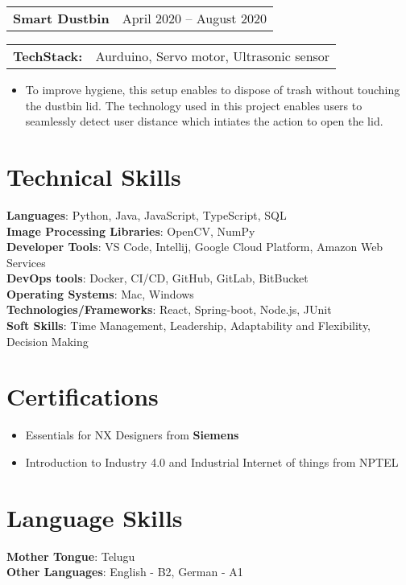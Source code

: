 \documentclass[letterpaper,11pt]{article}
\makeatletter
\newcommand{\resumeItem}[1]{
  \item\small{
    {#1 \vspace{-2pt}}
  }
}
\newcommand{\projecttitle}[2]{
  \noindent
  \begin{tabular*}{\textwidth}{l@{\extracolsep{\fill}}r}
    \textbf{\small#1} & \small#2
  \end{tabular*}
  \vspace{-15pt}
}
\newcommand{\techstack}[2]{
  \begin{tabularx}{\textwidth}{l@{\hspace{5pt}} X}
    \textbf{\small#1} & \small#2
  \end{tabularx}
  \vspace{-18pt}
}
\newcommand{\resumeItemListStart}{\begin{itemize}}
\newcommand{\resumeItemListEnd}{\end{itemize}\vspace{-5pt}}
\makeatother
\begin{document}
\projecttitle{Smart Dustbin}{April 2020 -- August 2020}

\techstack{TechStack:}{Aurduino, Servo motor, Ultrasonic sensor}
\resumeItemListStart
\resumeItem{To improve hygiene, this setup enables to dispose of trash without touching the dustbin lid. The technology used in this project enables users to seamlessly detect user distance which intiates the action to open the lid.}
\resumeItemListEnd

\vspace{-10pt}


%
\section{Technical Skills}
\begin{itemize}[leftmargin=0.15in, label={}]
  \small{\item{
        \textbf{Languages}{: Python, Java, JavaScript, TypeScript, SQL} \\
        \textbf{Image Processing Libraries}{: OpenCV, NumPy} \\
        \textbf{Developer Tools}{: VS Code, Intellij, Google Cloud Platform, Amazon Web Services} \\
        \textbf{DevOps tools}{: Docker, CI/CD, GitHub, GitLab, BitBucket} \\
        \textbf{Operating Systems}{: Mac, Windows} \\
        \textbf{Technologies/Frameworks}{: React, Spring-boot, Node.js, JUnit} \\
        \textbf{Soft Skills}{: Time Management, Leadership, Adaptability and Flexibility, Decision Making} \\
        }}
\end{itemize}
\vspace{-16pt}

\section{Certifications}
\resumeItemListStart
\resumeItem{Essentials for NX Designers from \textbf{Siemens}}
\resumeItem{Introduction to Industry 4.0 and Industrial Internet of things from NPTEL}
\resumeItemListEnd
\vspace{-16pt}


\section{Language Skills}
\begin{itemize}[leftmargin=0.15in, label={}]
  \small{\item{
        \textbf{Mother Tongue}{: Telugu} \\
        \textbf{Other Languages}{: English - B2, German - A1} \\
        }}
\end{itemize}
\vspace{-16pt}
\end{document}
